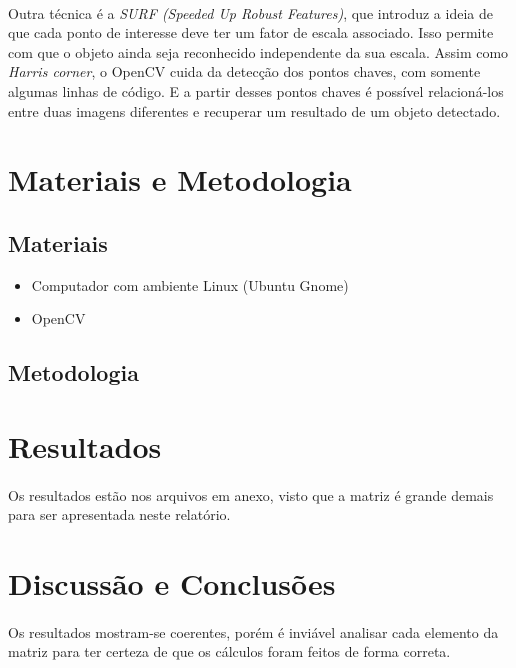 \documentclass[conference, harvard, brazil, english]{sbatex}
\begin{document}
		\paragraph{}
		Outra técnica é a \textit{SURF (Speeded Up Robust Features)}, que introduz a ideia de que cada ponto de interesse deve ter um fator de escala associado. Isso permite com que o objeto ainda seja reconhecido independente da sua escala. Assim como \textit{Harris corner}, o OpenCV cuida da detecção dos pontos chaves, com somente algumas linhas de código. E a partir desses pontos chaves é possível relacioná-los entre duas imagens diferentes e recuperar um resultado de um objeto detectado.
	
	
	\section{Materiais e Metodologia}
		\subsection{Materiais}
			\begin{itemize}
				\item Computador com ambiente Linux (Ubuntu Gnome)
				\item OpenCV
			\end{itemize}
		\subsection{Metodologia}
			\paragraph{}
			
			
		\section{Resultados}
			\paragraph{}
			Os resultados estão nos arquivos em anexo, visto que a matriz é grande demais para ser apresentada neste relatório.
		\section{Discussão e Conclusões}
			\paragraph{}
			Os resultados mostram-se coerentes, porém é inviável analisar cada elemento da matriz para ter certeza de que os cálculos foram feitos de forma correta.
			
		
\end{document}
